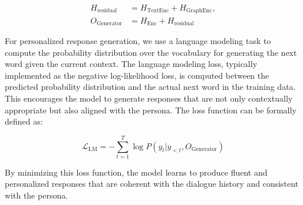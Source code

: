 \begin{equation} \label{eq:dynamic_weighted_aggregation_output}
    \begin{aligned}
        H_{\text{residual}} &= H_{\text{TextEnc}} + H_{\text{GraphEnc}}, \\
        O_{\text{Generator}} &= H_{\text{Enc}} + H_{\text{residual}}
    \end{aligned}
\end{equation}

For personalized response generation, we use a language modeling task to compute the probability distribution over the vocabulary for generating the next word given the current context. The language modeling loss, typically implemented as the negative log-likelihood loss, is computed between the predicted probability distribution and the actual next word in the training data. This encourages the model to generate responses that are not only contextually appropriate but also aligned with the persona. The loss function can be formally defined as:

\begin{equation}
    \mathcal{L}_{\text{LM}} = - \sum_{t=1}^{T} \log P(y_t | y_{<t}, O_{\text{Generator}})
\end{equation}

By minimizing this loss function, the model learns to produce fluent and personalized responses that are coherent with the dialogue history and consistent with the persona.

\EndChapter

